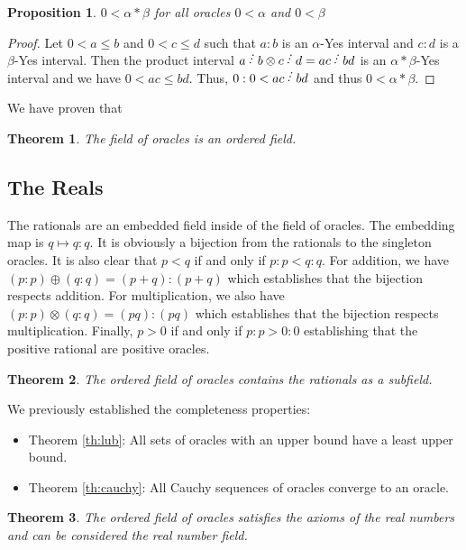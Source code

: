 \documentclass[12pt]{article}
\newtheorem{theorem}{Theorem}[subsection]
\newtheorem{proposition}{Proposition}[subsection]
\theoremstyle{remark}
\begin{document}
\begin{proposition}
$0 < \alpha*\beta$ for all oracles $0 < \alpha$ and $0< \beta$ 
\end{proposition}

\begin{proof}
Let $0 < a \leq b$ and $0<c \leq d$ such that $a:b$ is an $\alpha$-Yes interval and $c:d$ is a $\beta$-Yes interval. Then the product interval $a \lte b \otimes c \lte d = ac \lte bd$ is an $\alpha*\beta$-Yes interval and we have $0 < ac \leq bd$. Thus, $0:0 < ac \lte bd$ and thus $0 < \alpha*\beta$. 
\end{proof}

We have proven that

\begin{theorem}
The field of oracles is an ordered field.
\end{theorem}

\subsection{The Reals}

The rationals are an embedded field inside of the field of oracles. The embedding map is $q \mapsto q:q$. It is obviously a bijection from the rationals to the singleton oracles. It is also clear that $p<q$ if and only if $p:p < q:q$. For addition, we have $(p:p) \oplus (q:q) = (p+q):(p+q)$ which establishes that the bijection respects addition. For multiplication, we also have $(p:p) \otimes (q:q) = (pq):(pq)$ which establishes that the bijection respects multiplication.  Finally, $p>0$ if and only if $p:p > 0:0$ establishing that the positive rational are positive oracles. 

\begin{theorem}
The ordered field of oracles contains the rationals as a subfield. 
\end{theorem}

We previously established the completeness properties:

\begin{itemize}
    \item  Theorem \ref{th:lub}: All sets of oracles with an upper bound have a least upper bound. 
    \item Theorem \ref{th:cauchy}: All Cauchy sequences of oracles converge to an oracle. 
\end{itemize}

\begin{theorem}
The ordered field of oracles satisfies the axioms of the real numbers and can be considered the real number field. 
\end{theorem}
\end{document}
